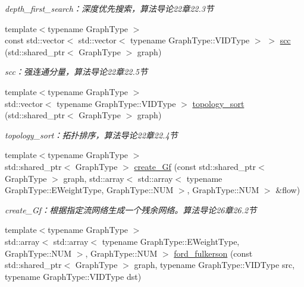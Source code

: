 \begin{DoxyCompactItemize}
\begin{DoxyCompactList}\small\item\em depth\+\_\+first\+\_\+search：深度优先搜索，算法导论22章22.3节 \end{DoxyCompactList}\item 
{\footnotesize template$<$typename Graph\+Type $>$ }\\const std\+::vector$<$ std\+::vector$<$ typename Graph\+Type\+::\+V\+I\+D\+Type $>$ $>$ \hyperlink{namespace_introduction_to_algorithm_1_1_graph_algorithm_a6d058c2aaa8714778b3f2ab8a24ff232}{scc} (std\+::shared\+\_\+ptr$<$ Graph\+Type $>$ graph)
\begin{DoxyCompactList}\small\item\em scc：强连通分量，算法导论22章22.5节 \end{DoxyCompactList}\item 
{\footnotesize template$<$typename Graph\+Type $>$ }\\std\+::vector$<$ typename Graph\+Type\+::\+V\+I\+D\+Type $>$ \hyperlink{namespace_introduction_to_algorithm_1_1_graph_algorithm_a804241e72be5f4c031190bc12a6b73a2}{topology\+\_\+sort} (std\+::shared\+\_\+ptr$<$ Graph\+Type $>$ graph)
\begin{DoxyCompactList}\small\item\em topology\+\_\+sort：拓扑排序，算法导论22章22.4节 \end{DoxyCompactList}\item 
{\footnotesize template$<$typename Graph\+Type $>$ }\\std\+::shared\+\_\+ptr$<$ Graph\+Type $>$ \hyperlink{namespace_introduction_to_algorithm_1_1_graph_algorithm_acc8cd65d7cf2d584f86cfd92494bdbf4}{create\+\_\+\+Gf} (const std\+::shared\+\_\+ptr$<$ Graph\+Type $>$ graph, std\+::array$<$ std\+::array$<$ typename Graph\+Type\+::\+E\+Weight\+Type, Graph\+Type\+::\+N\+U\+M $>$, Graph\+Type\+::\+N\+U\+M $>$ \&flow)
\begin{DoxyCompactList}\small\item\em create\+\_\+\+Gf：根据指定流网络生成一个残余网络。算法导论26章26.2节 \end{DoxyCompactList}\item 
{\footnotesize template$<$typename Graph\+Type $>$ }\\std\+::array$<$ std\+::array$<$ typename Graph\+Type\+::\+E\+Weight\+Type, Graph\+Type\+::\+N\+U\+M $>$, Graph\+Type\+::\+N\+U\+M $>$ \hyperlink{namespace_introduction_to_algorithm_1_1_graph_algorithm_a23a29754883e1edd7bd95a76634444a2}{ford\+\_\+fulkerson} (const std\+::shared\+\_\+ptr$<$ Graph\+Type $>$ graph, typename Graph\+Type\+::\+V\+I\+D\+Type src, typename Graph\+Type\+::\+V\+I\+D\+Type dst)

\end{DoxyCompactItemize}
